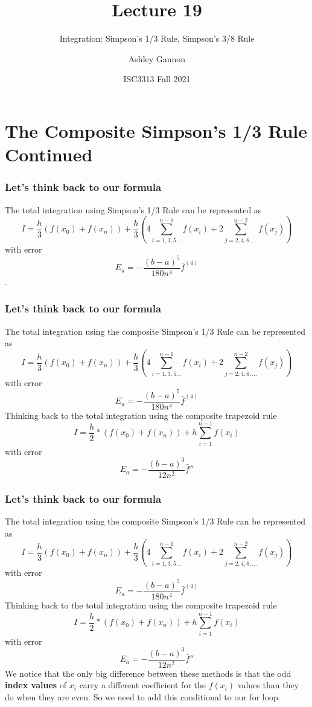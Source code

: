 \documentclass{if-beamer}
\title[Lecture 19]{Lecture 19}
\subtitle{Integration: Simpson's 1/3 Rule, Simpson's 3/8 Rule}
\author{Ashley Gannon}
\date{ISC3313 Fall 2021}
\begin{document}
\begin{frame}
  \titlepage
\end{frame}
\section{The Composite Simpson's 1/3 Rule Continued}

\begin{frame}
\frametitle{Let's think back to our formula}
The total integration using Simpson's 1/3 Rule can be represented as
$$I = \frac{h}{3}(f(x_0)+f(x_n))+\frac{h}{3}\left( 4\sum_{i = 1,3,5...}^{n-1}f(x_i) + 2\sum_{j = 2,4,6,...}^{n-2} f(x_j) \right)$$
with error
$$ E_a = -\frac{(b-a)^5}{180n^4}\bar{f}^{(4)}$$.
\end{frame}

\begin{frame}
	\frametitle{Let's think back to our formula}
	The total integration using the composite Simpson's 1/3 Rule can be represented as
	$$I = \frac{h}{3}(f(x_0)+f(x_n))+\frac{h}{3}\left( 4\sum_{i = 1,3,5...}^{n-1}f(x_i) + 2\sum_{j = 2,4,6,...}^{n-2} f(x_j) \right)$$
	with error
	$$ E_a = -\frac{(b-a)^5}{180n^4}\bar{f}^{(4)}$$
	Thinking back to the total integration using the composite trapezoid rule
	$$ I = \frac{h}{2}*(f(x_0)+f(x_n))+h\sum_{i=1}^{n-1}f(x_i)$$ 
	with error
	$$E_a = -\frac{(b-a)^3}{12n^2}\bar{f}''$$
\end{frame}

\begin{frame}
	\frametitle{Let's think back to our formula}
	The total integration using the composite Simpson's 1/3 Rule can be represented as
	$$I = \frac{h}{3}(f(x_0)+f(x_n))+\frac{h}{3}\left( 4\sum_{i = 1,3,5...}^{n-1}f(x_i) + 2\sum_{j = 2,4,6,...}^{n-2} f(x_j) \right)$$
	with error
	$$ E_a = -\frac{(b-a)^5}{180n^4}\bar{f}^{(4)}$$
	Thinking back to the total integration using the composite trapezoid rule
	$$ I = \frac{h}{2}*(f(x_0)+f(x_n))+h\sum_{i=1}^{n-1}f(x_i)$$ 
	with error
	$$E_a = -\frac{(b-a)^3}{12n^2}\bar{f}''$$
	We notice that the only big difference between these methods is that the odd \textbf{index values} of $x_i$ carry a different coefficient for the $f(x_i)$ values than they do when they are even. So we need to add this conditional to our for loop. 
\end{frame}
\end{document}

